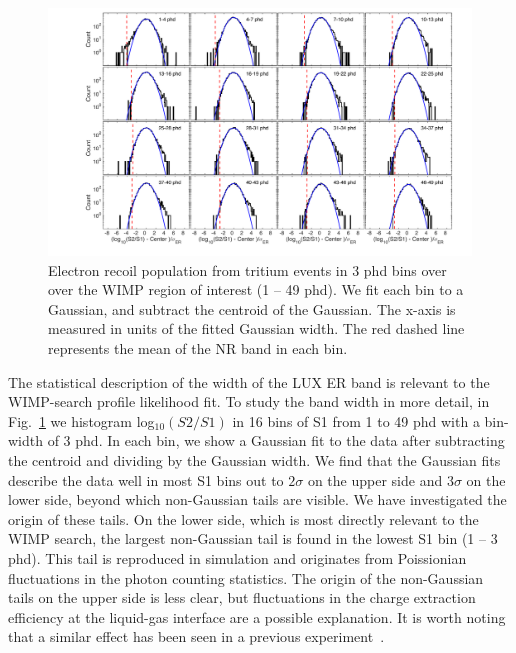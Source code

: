 \onecolumngrid
\break
\begin{figure}[t!]
\includegraphics[width=140mm]{fig13.pdf}
\caption{Electron recoil population from tritium events in 3 phd bins over over the WIMP region of interest (1 -- 49 phd). We fit each bin to a Gaussian, and subtract the centroid of the Gaussian. The x-axis is measured in units of the fitted Gaussian width. The red dashed line represents the mean of the NR band in each bin. }
\label{fig:ER-Gauss}
\end{figure}
\twocolumngrid


The statistical description of the width of the LUX ER band is relevant to the WIMP-search profile likelihood fit. To study the band width in more detail, in Fig.~\ref{fig:ER-Gauss} we histogram log$_{10}(S2/S1)$ in 16 bins of S1 from 1 to 49 phd with a bin-width of 3 phd. In each bin, we show a Gaussian fit to the data after subtracting the centroid and dividing by the Gaussian width. We find that the Gaussian fits describe the data well  in most S1 bins out to $2\sigma$ on the upper side and $3\sigma$ on the lower side, beyond which non-Gaussian tails are visible.  We have investigated the origin of these tails. On the lower side, which is most directly relevant to the WIMP search, the largest non-Gaussian tail is found in the lowest S1 bin (1 -- 3 phd). This tail is reproduced in simulation and originates from Poissionian fluctuations in the photon counting statistics. The origin of the non-Gaussian tails on the upper side is less clear, but fluctuations in the charge extraction efficiency at the liquid-gas interface are a possible explanation. It is worth noting that a similar effect has been seen in a previous experiment~\cite{zep3}.

